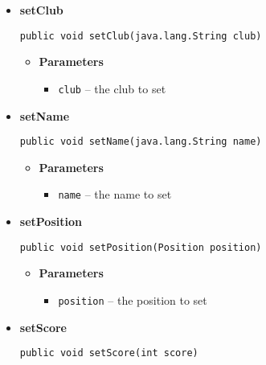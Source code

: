\documentclass[11pt,a4paper]{report}
\begin{document}
{{{{{{\begin{itemize}
{\begin{itemize}
\item{{\bf  Returns} -- 
the value 
}%
\end{itemize}
}%
\item{ 
{\bf  setClub}\\
\begin{lstlisting}[frame=none]
public void setClub(java.lang.String club)\end{lstlisting} %
\begin{itemize}
\item{
{\bf  Parameters}
  \begin{itemize}
   \item{
\texttt{club} -- the club to set}
  \end{itemize}
}%
\end{itemize}
}%
\item{ 
{\bf  setName}\\
\begin{lstlisting}[frame=none]
public void setName(java.lang.String name)\end{lstlisting} %
\begin{itemize}
\item{
{\bf  Parameters}
  \begin{itemize}
   \item{
\texttt{name} -- the name to set}
  \end{itemize}
}%
\end{itemize}
}%
\item{ 
{\bf  setPosition}\\
\begin{lstlisting}[frame=none]
public void setPosition(Position position)\end{lstlisting} %
\begin{itemize}
\item{
{\bf  Parameters}
  \begin{itemize}
   \item{
\texttt{position} -- the position to set}
  \end{itemize}
}%
\end{itemize}
}%
\item{ 
{\bf  setScore}\\
\begin{lstlisting}[frame=none]
public void setScore(int score)\end{lstlisting} %
\begin{itemize}

\end{itemize}}
\end{itemize}}}}}}}
\end{document}
